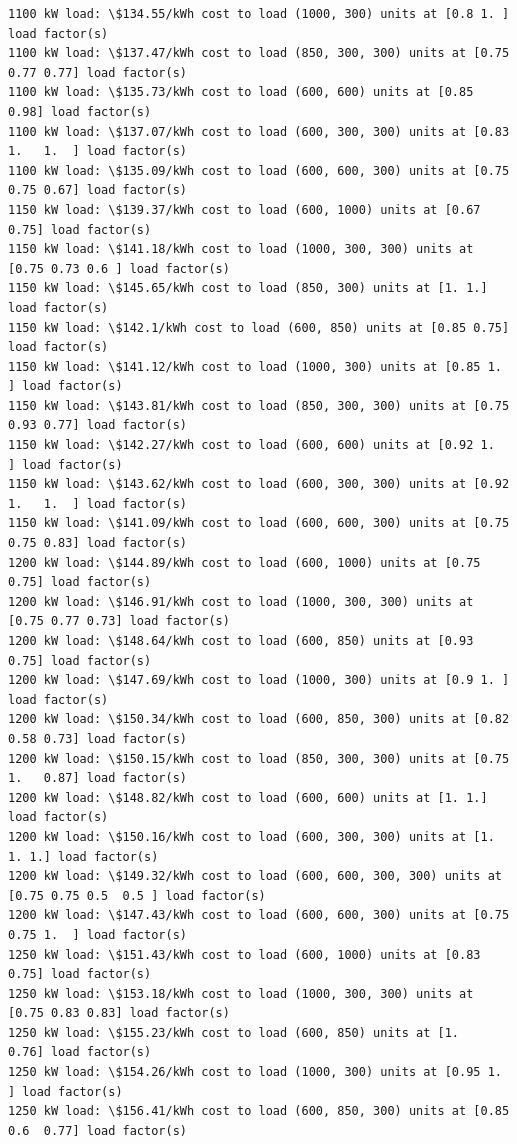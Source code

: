 \documentclass[11pt]{article}
\begin{document}
\begin{Verbatim}[commandchars=\\\{\}]
1100 kW load: \$134.55/kWh cost to load (1000, 300) units at [0.8 1. ] load factor(s)
1100 kW load: \$137.47/kWh cost to load (850, 300, 300) units at [0.75 0.77 0.77] load factor(s)
1100 kW load: \$135.73/kWh cost to load (600, 600) units at [0.85 0.98] load factor(s)
1100 kW load: \$137.07/kWh cost to load (600, 300, 300) units at [0.83 1.   1.  ] load factor(s)
1100 kW load: \$135.09/kWh cost to load (600, 600, 300) units at [0.75 0.75 0.67] load factor(s)
1150 kW load: \$139.37/kWh cost to load (600, 1000) units at [0.67 0.75] load factor(s)
1150 kW load: \$141.18/kWh cost to load (1000, 300, 300) units at [0.75 0.73 0.6 ] load factor(s)
1150 kW load: \$145.65/kWh cost to load (850, 300) units at [1. 1.] load factor(s)
1150 kW load: \$142.1/kWh cost to load (600, 850) units at [0.85 0.75] load factor(s)
1150 kW load: \$141.12/kWh cost to load (1000, 300) units at [0.85 1.  ] load factor(s)
1150 kW load: \$143.81/kWh cost to load (850, 300, 300) units at [0.75 0.93 0.77] load factor(s)
1150 kW load: \$142.27/kWh cost to load (600, 600) units at [0.92 1.  ] load factor(s)
1150 kW load: \$143.62/kWh cost to load (600, 300, 300) units at [0.92 1.   1.  ] load factor(s)
1150 kW load: \$141.09/kWh cost to load (600, 600, 300) units at [0.75 0.75 0.83] load factor(s)
1200 kW load: \$144.89/kWh cost to load (600, 1000) units at [0.75 0.75] load factor(s)
1200 kW load: \$146.91/kWh cost to load (1000, 300, 300) units at [0.75 0.77 0.73] load factor(s)
1200 kW load: \$148.64/kWh cost to load (600, 850) units at [0.93 0.75] load factor(s)
1200 kW load: \$147.69/kWh cost to load (1000, 300) units at [0.9 1. ] load factor(s)
1200 kW load: \$150.34/kWh cost to load (600, 850, 300) units at [0.82 0.58 0.73] load factor(s)
1200 kW load: \$150.15/kWh cost to load (850, 300, 300) units at [0.75 1.   0.87] load factor(s)
1200 kW load: \$148.82/kWh cost to load (600, 600) units at [1. 1.] load factor(s)
1200 kW load: \$150.16/kWh cost to load (600, 300, 300) units at [1. 1. 1.] load factor(s)
1200 kW load: \$149.32/kWh cost to load (600, 600, 300, 300) units at [0.75 0.75 0.5  0.5 ] load factor(s)
1200 kW load: \$147.43/kWh cost to load (600, 600, 300) units at [0.75 0.75 1.  ] load factor(s)
1250 kW load: \$151.43/kWh cost to load (600, 1000) units at [0.83 0.75] load factor(s)
1250 kW load: \$153.18/kWh cost to load (1000, 300, 300) units at [0.75 0.83 0.83] load factor(s)
1250 kW load: \$155.23/kWh cost to load (600, 850) units at [1.   0.76] load factor(s)
1250 kW load: \$154.26/kWh cost to load (1000, 300) units at [0.95 1.  ] load factor(s)
1250 kW load: \$156.41/kWh cost to load (600, 850, 300) units at [0.85 0.6  0.77] load factor(s)

\end{Verbatim}
\end{document}
